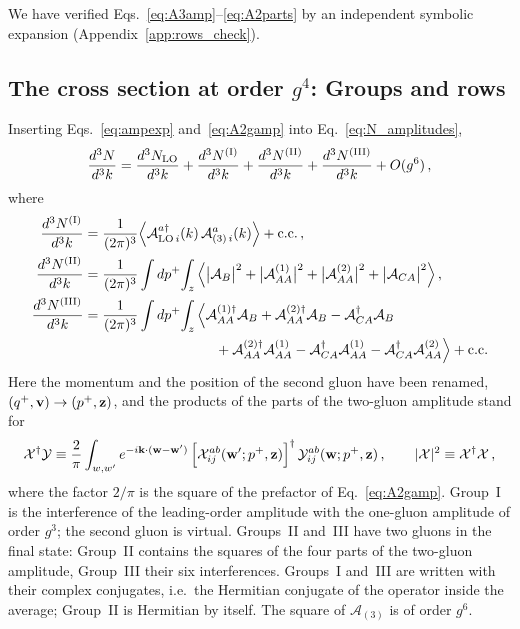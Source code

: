 We have verified Eqs.~\eqref{eq:A3amp}--\eqref{eq:A2parts} by an independent symbolic expansion (Appendix~\ref{app:rows_check}).

\subsection{The cross section at order \texorpdfstring{$g^4$}{g4}: Groups and rows}\label{sec:groups}

Inserting Eqs.~\eqref{eq:ampexp} and~\eqref{eq:A2gamp} into Eq.~\eqref{eq:N_amplitudes},
\begin{align}\label{eq:NLOdecomp}
\frac{d^3N}{d^3k}=\frac{d^3N_{\rm LO}}{d^3k}+\frac{d^3N^{\rm(I)}}{d^3k}+\frac{d^3N^{\rm(II)}}{d^3k}+\frac{d^3N^{\rm(III)}}{d^3k}+O(g^6)\,,
\end{align}
where
\begin{align}\label{eq:Groups}
\frac{d^3N^{\rm(I)}}{d^3k}&=\frac{1}{(2\pi)^3}\Big\langle\mathcal A^{a\dagger}_{{\rm LO}\,i}(k)\,\mathcal A^a_{(3)\,i}(k)\Big\rangle+{\rm c.c.}\,,\notag\\
\frac{d^3N^{\rm(II)}}{d^3k}&=\frac{1}{(2\pi)^3}\int dp^+\!\int_z\Big\langle\big|\mathcal A_B\big|^2+\big|\mathcal A^{(1)}_{AA}\big|^2+\big|\mathcal A^{(2)}_{AA}\big|^2+\big|\mathcal A_{CA}\big|^2\Big\rangle\,,\notag\\
\frac{d^3N^{\rm(III)}}{d^3k}&=\frac{1}{(2\pi)^3}\int dp^+\!\int_z\Big\langle\mathcal A^{(1)\dagger}_{AA}\mathcal A_B+\mathcal A^{(2)\dagger}_{AA}\mathcal A_B-\mathcal A^{\dagger}_{CA}\mathcal A_B
\notag\\&\hspace{3.3cm}+\mathcal A^{(2)\dagger}_{AA}\mathcal A^{(1)}_{AA}-\mathcal A^{\dagger}_{CA}\mathcal A^{(1)}_{AA}-\mathcal A^{\dagger}_{CA}\mathcal A^{(2)}_{AA}\Big\rangle+{\rm c.c.}
\end{align}
Here the momentum and the position of the second gluon have been renamed, $(q^+,\mathbf{v})\to(p^+,\mathbf{z})$, and the products of the parts of the two-gluon amplitude stand for
\begin{align}\label{eq:XYdef}
\mathcal X^\dagger\mathcal Y\equiv\frac{2}{\pi}\int_{w,w'}e^{-i\mathbf{k}\cdot(\mathbf{w}-\mathbf{w}')}\,\Big[\mathcal X^{ab}_{ij}(\mathbf{w}';p^+,\mathbf{z})\Big]^\dagger\,\mathcal Y^{ab}_{ij}(\mathbf{w};p^+,\mathbf{z})\,,\qquad|\mathcal X|^2\equiv\mathcal X^\dagger\mathcal X\,,
\end{align}
where the factor $2/\pi$ is the square of the prefactor of Eq.~\eqref{eq:A2gamp}. Group~I is the interference of the leading-order amplitude with the one-gluon amplitude of order $g^3$; the second gluon is virtual. Groups~II and~III have two gluons in the final state: Group~II contains the squares of the four parts of the two-gluon amplitude, Group~III their six interferences. Groups~I and~III are written with their complex conjugates, i.e.\ the Hermitian conjugate of the operator inside the average; Group~II is Hermitian by itself. The square of $\mathcal A_{(3)}$ is of order $g^6$.

